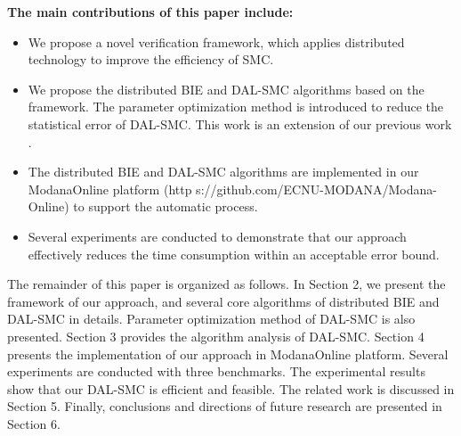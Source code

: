\textbf{The main contributions of this paper include:} 
\begin{itemize}
\item
We propose a novel verification framework, which applies distributed technology to improve the efficiency of SMC.
\item
We propose the distributed BIE and DAL-SMC algorithms based on the framework. The parameter optimization method is introduced to reduce the statistical error of DAL-SMC. This work is an extension of our previous work \cite{jiangkaiqiang2016}.
\item
The distributed BIE and DAL-SMC algorithms are implemented in our ModanaOnline platform  \cite{Cheng2015Modana} (http
s://github.com/ECNU-MODANA/Modana-Online) to support the automatic process. 
\item
Several experiments are conducted to demonstrate that our approach effectively reduces the time consumption within an acceptable error bound.
\end{itemize}

The remainder of this paper is organized as follows. In Section 2, we present the framework of our approach, and several core algorithms of distributed BIE and DAL-SMC in details. Parameter optimization method of DAL-SMC is also presented. Section 3 provides the algorithm analysis of DAL-SMC. Section 4 presents the implementation of our approach in ModanaOnline platform. Several experiments are conducted with three benchmarks. The experimental results show that our DAL-SMC is efficient and feasible. The related work is discussed in Section 5. Finally, conclusions and directions of future research are presented in Section 6. 